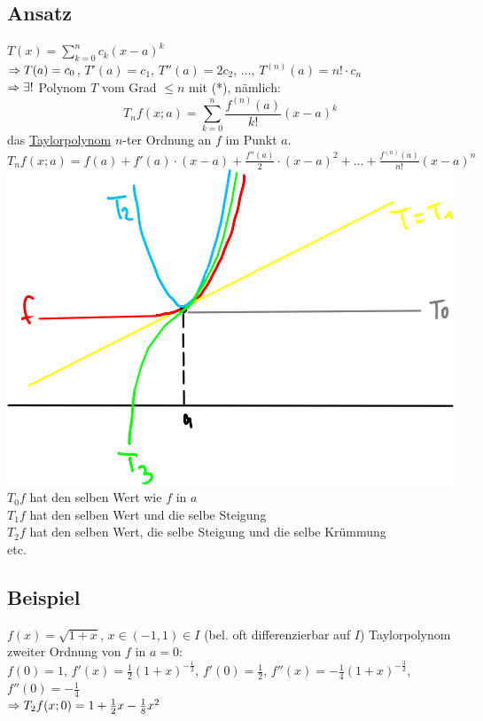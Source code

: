 \subsection*{Ansatz}
$T(x) = \sum_{k=0}^n c_k (x-a)^k$\\
$\Rightarrow T(a) = c_0$, $T'(a)=c_1$, $T''(a)=2c_2$, $\ldots$, $T^{(n)}(a) = n! \cdot c_n$\\
$\Rightarrow \exists!$ Polynom $T$ vom Grad $\le n$ mit (*), nämlich:
$$T_n f(x; a) = \sum_{k=0}^n \frac{f^{(n)}(a)}{k!} (x-a)^k$$
das \underline{Taylorpolynom} $n$-ter Ordnung an $f$ im Punkt $a$.\nl
$T_n f(x; a) = f(a) + f'(a) \cdot (x-a) + \frac{f''(a)}{2} \cdot (x-a)^2 + \ldots + \frac{f^{(n)}(a)}{n!} (x-a)^n$\nl
\includegraphics[scale=0.5]{img/2014-01-30/2}\nl %
$T_0 f$ hat den selben Wert wie $f$ in $a$\\
$T_1 f$ hat den selben Wert und die selbe Steigung\\
$T_2 f$ hat den selben Wert, die selbe Steigung und die selbe Krümmung\\
etc.

\subsection*{Beispiel}
$f(x) = \sqrt{1+x}$, $x \in (-1,1) \in I$ (bel. oft differenzierbar auf $I$)\nl
Taylorpolynom zweiter Ordnung von $f$ in $a=0$:\\
$f(0)=1$, $f'(x) = \frac{1}{2} (1+x)^{-\frac{1}{2}}$, $f'(0)=\frac{1}{2}$, $f''(x)=-\frac{1}{4} (1+x)^{-\frac{3}{2}}$, $f''(0) = -\frac{1}{4}$\\
$\Rightarrow T_2 f(x;0) = 1 + \frac{1}{2} x - \frac{1}{8} x^2$

